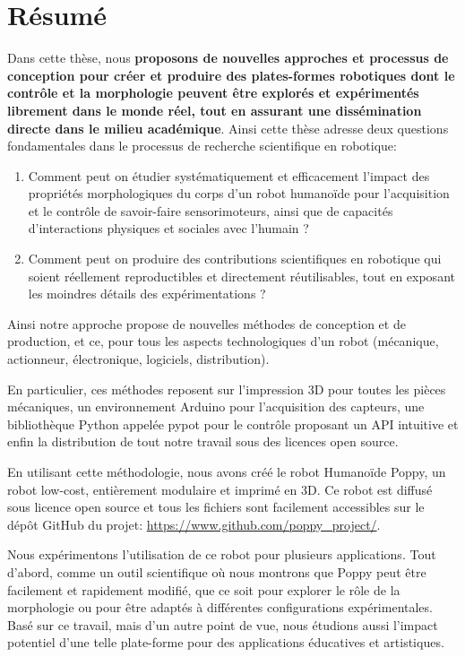 
\chapter*{Résumé}

Dans cette thèse, nous \textbf{proposons de nouvelles approches et processus de conception pour créer et produire des plates-formes robotiques dont le contrôle et la morphologie peuvent être explorés et expérimentés librement dans le monde réel, tout en assurant une dissémination directe dans le milieu académique}.
Ainsi cette thèse adresse deux questions fondamentales dans le processus de recherche scientifique en robotique:

\begin{enumerate}
  \item Comment peut on étudier systématiquement et efficacement l’impact des propriétés morphologiques du corps d’un robot humanoïde pour l’acquisition et le contrôle de savoir-faire sensorimoteurs, ainsi que de capacités d’interactions physiques et sociales avec l’humain ?
  \item Comment peut on produire des contributions scientifiques en robotique qui soient réellement reproductibles et directement réutilisables, tout en exposant les moindres détails des expérimentations ?
\end{enumerate}

Ainsi notre approche propose de nouvelles méthodes de conception et de production, et ce, pour tous les aspects technologiques d'un robot (mécanique, actionneur, électronique, logiciels, distribution).

En particulier, ces méthodes reposent sur l'impression 3D pour toutes les pièces mécaniques, un environnement Arduino pour l'acquisition des capteurs, une bibliothèque Python appelée pypot pour le contrôle proposant un API intuitive et enfin la distribution de tout notre travail sous des licences open source. 

En utilisant cette méthodologie, nous avons créé le robot Humanoïde Poppy, un robot low-cost, entièrement modulaire et imprimé en 3D. Ce robot est diffusé sous licence open source et tous les fichiers sont facilement accessibles sur le dépôt GitHub du projet: \url{https://www.github.com/poppy_project/}.

Nous expérimentons l'utilisation de ce robot pour plusieurs applications. Tout d'abord, comme un outil scientifique où nous montrons que Poppy peut être facilement et rapidement modifié, que ce soit pour explorer le rôle de la morphologie ou pour être adaptés à différentes configurations expérimentales. Basé sur ce travail, mais d'un autre point de vue, nous étudions aussi l'impact potentiel d'une telle plate-forme pour des applications éducatives et artistiques.


